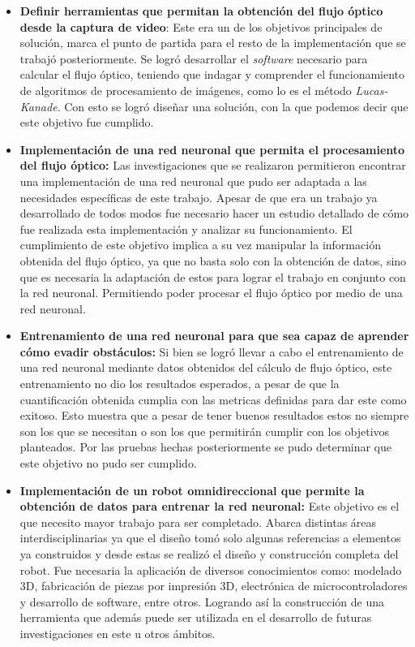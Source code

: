 \documentclass{iccmemoria}
\begin{document}
\begin{itemize}
	\item {\bf Definir herramientas que permitan la obtención del flujo óptico desde la captura de video}: Este era un de los objetivos principales de solución, marca el punto de partida para el resto de la implementación que se trabajó posteriormente. Se logró desarrollar el \emph{software} necesario para calcular el flujo óptico, teniendo que indagar y comprender el funcionamiento de algoritmos de procesamiento de imágenes, como lo es el método \emph{Lucas-Kanade}. Con esto se logró diseñar una solución, con la que podemos decir que este objetivo fue cumplido.\\
	
	\item {\bf Implementación de una red neuronal que permita el procesamiento del flujo óptico:} Las investigaciones que se realizaron permitieron encontrar una implementación de una red neuronal que pudo ser adaptada a las necesidades específicas de este trabajo. Apesar de que era un trabajo ya desarrollado de todos modos fue necesario hacer un estudio detallado de cómo fue realizada esta implementación y analizar su funcionamiento. El cumplimiento de este objetivo implica a su vez manipular la información obtenida del flujo óptico, ya que no basta  solo con la obtención de datos, sino que es necesaria la adaptación de estos para lograr el trabajo en conjunto con la red neuronal. Permitiendo poder procesar el flujo óptico por medio de una red neuronal.\\
	
	\item {\bf Entrenamiento de una red neuronal para que sea capaz de aprender cómo evadir obstáculos:} Si bien se logró llevar a cabo el entrenamiento de una red neuronal mediante datos obtenidos del cálculo de flujo óptico, este entrenamiento no dio los resultados esperados, a pesar de que la cuantificación obtenida cumplia con las metricas definidas para dar este como exitoso. Esto muestra que a pesar de tener buenos resultados estos no siempre son los que se necesitan o son los que permitirán cumplir con los objetivos planteados. Por las pruebas hechas posteriormente se pudo determinar que este objetivo no pudo ser cumplido.\\
	
	\item {\bf Implementación de un robot omnidireccional que permite la obtención de datos para entrenar la red neuronal:} Este objetivo es el que necesito mayor trabajo para ser completado. Abarca distintas áreas interdisciplinarias ya que el diseño tomó solo algunas referencias a elementos ya construidos y desde estas se realizó el diseño y construcción completa del robot. Fue necesaria la aplicación de diversos conocimientos como: modelado 3D, fabricación de piezas por impresión 3D, electrónica de microcontroladores y desarrollo de software, entre otros. Logrando así la construcción de una herramienta que además puede ser utilizada en el desarrollo de futuras investigaciones en este u otros ámbitos.\\
	

\end{itemize}
\end{document}
